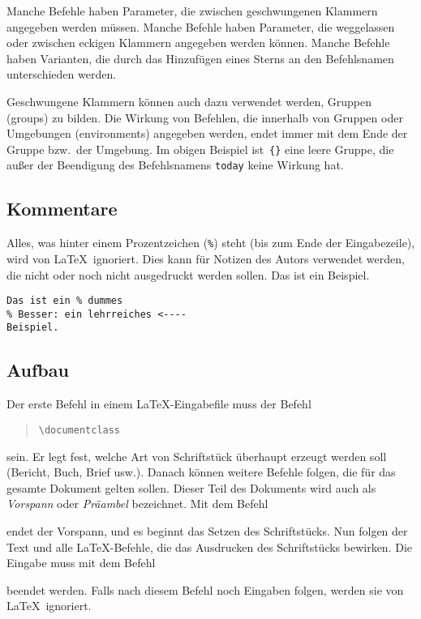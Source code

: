 Manche Befehle haben Parameter, die zwischen geschwungenen
Klammern angegeben werden müssen.
Manche Befehle haben Parameter, die weggelassen oder zwischen
eckigen Klammern angegeben werden können.
Manche Befehle haben Varianten, die durch das Hinzufügen
eines Sterns an den Befehlsnamen unterschieden werden.

Geschwungene Klammern können auch dazu verwendet werden, Gruppen
(groups) zu bilden.
Die Wirkung von Befehlen, die innerhalb von Gruppen oder
Umgebungen (environments) angegeben werden, endet immer mit dem
Ende der Gruppe bzw.\ der Umgebung.  Im obigen Beispiel
ist~\verb|{}| eine leere Gruppe, die außer der Beendigung des
Befehlsnamens \texttt{today} keine Wirkung hat.
 
\subsection{Kommentare}
 
Alles, was hinter einem Prozentzeichen (\verb|%|)
steht (bis zum Ende der Eingabezeile), wird von \LaTeX\ 
ignoriert.
Dies kann für Notizen des Autors verwendet werden, die nicht
oder noch nicht ausgedruckt werden sollen.
\exa
Das ist ein %
Beispiel.
\exb
\begin{verbatim}
Das ist ein % dummes
% Besser: ein lehrreiches <----
Beispiel.
\end{verbatim}
\exc
 
\subsection{Aufbau}
 
Der erste Befehl in einem \LaTeX-Eingabefile muss der Befehl
\begin{quote}
\verb|\documentclass|
\end{quote}
sein.
Er legt fest, welche Art von Schriftstück überhaupt erzeugt werden soll
(Bericht, Buch, Brief usw.).
Danach können weitere Befehle folgen, die für das gesamte
Dokument gelten sollen.  Dieser Teil des Dokuments wird auch als 
\emph{Vorspann} oder \emph{Präambel} bezeichnet.  Mit dem Befehl
\begin{quote}
\verb||
\end{quote}
endet der Vorspann, und es 
beginnt das Setzen des Schriftstücks.
Nun folgen der Text und alle \LaTeX-Befehle, die das Ausdrucken
des Schriftstücks bewirken.
Die Eingabe muss mit dem Befehl
\begin{quote}
\verb||
\end{quote}
beendet werden.
Falls nach diesem Befehl noch Eingaben folgen, werden sie von
\LaTeX\ ignoriert.
 
